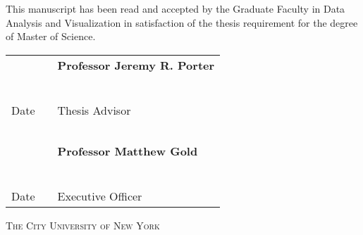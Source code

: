 \begin{center}
This manuscript has been read and accepted by the Graduate Faculty in Data Analysis and Visualization in satisfaction of the thesis requirement for the degree of Master of Science.
\end{center}

\vspace{0.75in}

\begin{tabular}{p{1.75in}p{0.5in}p{3.5in}}
~                                   & & \textbf{Professor Jeremy R. Porter}\\
~                                   & & \\
\hrulefill                          & &\hrulefill \\
Date                                & & Thesis Advisor\\
~                                   & & \\
~                                   & & \textbf{Professor Matthew Gold}\\
~                                   & & \\
\hrulefill                          & &\hrulefill \\
Date                                & & Executive Officer\\
\end{tabular}

\vspace{0.75in}


\vspace{\fill}
\begin{center}
\textsc{The City University of New York}
\end{center}